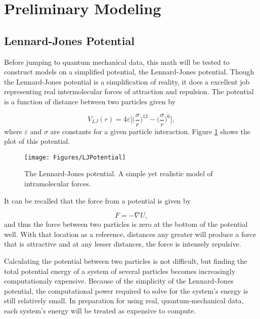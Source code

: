 \section{Preliminary Modeling}\label{Sect:modelPrep}

\subsection{Lennard-Jones Potential}\label{Sect:LJPotential}
Before jumping to quantum mechanical data, this math will be tested to construct models on a simplified potential, the Lennard-Jones potential. Though the Lennard-Jones potential is a simplification of reality, it does a excellent job representing real intermolecular forces of attraction and repulsion. The potential is a function of distance between two particles given by

\begin{equation} \label{LJ}
V_{LJ}(r) = 4\varepsilon \bigg[\Big(\frac{\sigma}{r}\Big)^{12} - \Big(\frac{\sigma}{r}\Big)^6\bigg],
\end{equation}
where $\varepsilon$ and $\sigma$ are constants for a given particle interaction. Figure \ref{figLJ} shows the plot of this potential.

\begin{figure}[h]
\texttt{[image: Figures/LJPotential]}
\caption{The Lennard-Jones potential. A simple yet realistic model of intramolecular forces.
\label{figLJ}} 
\end{figure}

\par It can be recalled that the force from a potential is given by

\begin{equation} \label{forceEq}
F = -\nabla U,
\end{equation}
and thus the force between two particles is zero at the bottom of the potential well. With that location as a reference, distances any greater will produce a force that is attractive and at any lesser distances, the force is intensely repulsive.
\par Calculating the potential between two particles is not difficult, but finding the total potential energy of a system of several particles becomes increasingly computationaly expensive. Because of the simplicity of the Lennard-Jones potential, the computational power required to solve for the system's energy is still relatively small. In preparation for using real, quantum-mechanical data, each system's energy will be treated as expensive to compute. 



